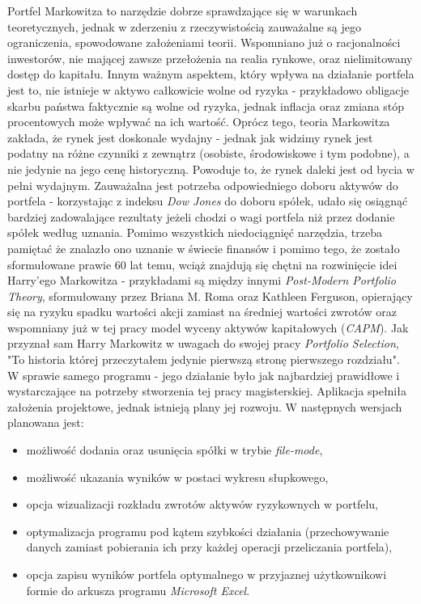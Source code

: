 \documentclass[magister]{dyplom}
\begin{document}
Portfel Markowitza to narzędzie dobrze sprawdzające się w warunkach teoretycznych, jednak w zderzeniu z rzeczywistością zauważalne są jego ograniczenia, spowodowane założeniami teorii. Wspomniano już o racjonalności inwestorów, nie mającej zawsze przełożenia na realia rynkowe, oraz nielimitowany dostęp do kapitału. Innym ważnym aspektem, który wpływa na działanie portfela jest to, nie istnieje w aktywo całkowicie wolne od ryzyka - przykładowo obligacje skarbu państwa faktycznie są wolne od ryzyka, jednak inflacja oraz zmiana stóp procentowych może wpływać na ich wartość.\cite{hip} Oprócz tego, teoria Markowitza zakłada, że rynek jest doskonale wydajny \cite{markowitz} - jednak jak widzimy rynek jest podatny na różne czynniki z zewnątrz (osobiste, środowiskowe i tym podobne), a nie jedynie na jego cenę historyczną. Powoduje to, że rynek daleki jest od bycia w pełni wydajnym.
Zauważalna jest potrzeba odpowiedniego doboru aktywów do portfela - korzystając z indeksu \textit{Dow Jones} do doboru spółek, udało się osiągnąć bardziej zadowalające rezultaty jeżeli chodzi o wagi portfela niż przez dodanie spółek według uznania.
Pomimo wszystkich niedociągnięć narzędzia, trzeba pamiętać że znalazło ono uznanie w świecie finansów i pomimo tego, że zostało sformułowane prawie 60 lat temu, wciąż znajdują się chętni na rozwinięcie idei Harry'ego Markowitza - przykładami są między innymi \textit{Post-Modern Portfolio Theory}, sformułowany przez Briana M. Roma oraz Kathleen Ferguson, opierający się na ryzyku spadku wartości akcji zamiast na średniej wartości zwrotów\cite{pmpt} oraz wspomniany już w tej pracy model wyceny aktywów kapitałowych (\textit{CAPM})\cite{holton}. Jak przyznał sam Harry Markowitz w uwagach do swojej pracy \textit{Portfolio Selection}, "To historia której przeczytałem jedynie pierwszą stronę pierwszego rozdziału"\cite{markowitz}.
\\
W sprawie samego programu - jego działanie było jak najbardziej prawidłowe i wystarczające na potrzeby stworzenia tej pracy magisterskiej. Aplikacja spełniła założenia projektowe, jednak istnieją plany jej rozwoju. W następnych wersjach planowana jest:
\begin{itemize}
	\item możliwość dodania oraz usunięcia spółki w trybie \textit{file-mode},
	\item możliwość ukazania wyników w postaci wykresu słupkowego,
	\item opcja wizualizacji rozkładu zwrotów aktywów ryzykownych w portfelu,
	\item optymalizacja programu pod kątem szybkości działania (przechowywanie danych zamiast pobierania ich przy każdej operacji przeliczania portfela),
	\item opcja zapisu wyników portfela optymalnego w przyjaznej użytkownikowi formie do arkusza programu \textit{Microsoft Excel}.
\end{itemize}
\end{document}
